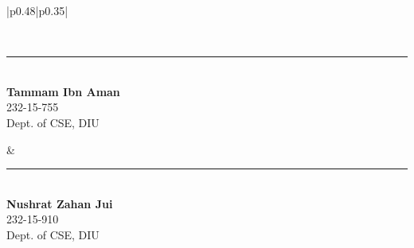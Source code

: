 \begin{table}[h!]
\centering
\renewcommand{\arraystretch}{3} %
\setlength{\tabcolsep}{10pt} %

\begin{tabular}{|p{0.48\textwidth}|p{0.35\textwidth}|} %

\hline
{} \\
\hline

\begin{minipage}{\linewidth}
    \centering
    \vspace{1.5cm} %
    \rule{6cm}{0.4pt} %
    \\
    \textbf{Tammam Ibn Aman} \\ 232-15-755 \\ Dept. of CSE, DIU
\end{minipage} &

\begin{minipage}{\linewidth}
    \centering
    \vspace{1.5cm} %
    \rule{6cm}{0.4pt} %
    \\
    \textbf{Nushrat Zahan Jui} \\ 232-15-910 \\ Dept. of CSE, DIU
\end{minipage} \\
\hline
\end{tabular}
\end{table}
